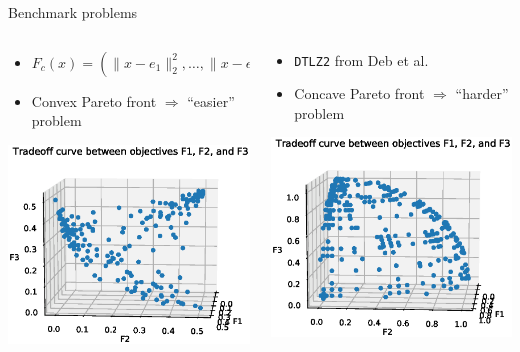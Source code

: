 \documentclass[xcolor=dvipsnames]{beamer}
\begin{document}
\begin{frame}{Benchmark problems}
\begin{columns}
\begin{column}{.48\textwidth}
\begin{itemize}
\item $F_{c}(x) = (\|x - e_1\|_2^2, \ldots, \|x - e_p\|_2^2)$
\item Convex Pareto front $\Rightarrow$ ``easier'' problem
\end{itemize}
\includegraphics[width=\textwidth]{f_conv_2.eps}
\end{column}
\begin{column}{.48\textwidth}
\begin{itemize}
\item {\tt DTLZ2} from Deb et al.
\item Concave Pareto front $\Rightarrow$ ``harder'' problem
\end{itemize}
\includegraphics[width=\textwidth]{dtlz2_2.eps}
\end{column}
\end{columns}
\end{frame}
\end{document}
